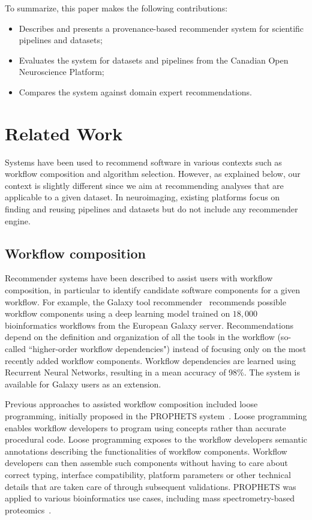 To summarize, this paper makes the following contributions:
\begin{itemize}
\item  Describes and presents a provenance-based recommender system for scientific
pipelines and datasets;
\item Evaluates the system for datasets and pipelines from the Canadian
Open Neuroscience Platform;
\item Compares the system against domain expert recommendations.
\end{itemize}

\section{Related Work}
    
Systems have been used to recommend software in various contexts such as workflow composition and algorithm selection. However, as explained below, our context is slightly different since we aim at recommending analyses that are applicable to a given dataset. In neuroimaging, existing platforms focus on finding and reusing pipelines and datasets but do not include any recommender engine.
    
\subsection{Workflow composition}

Recommender systems have been described to assist users with workflow composition, in particular to identify candidate software components for a given workflow. For example, the Galaxy tool recommender~\cite{kumar2021tool} recommends possible workflow components using a deep learning model trained on $18,000$ bioinformatics workflows from the European Galaxy server. Recommendations depend on the definition and organization of all the tools in the workflow (so-called ``higher-order workflow dependencies") instead of focusing only on the most recently added workflow components. Workflow dependencies are learned using Recurrent Neural Networks, resulting in a mean accuracy of 98\%. The system is available for Galaxy users as an extension. 

Previous approaches to assisted workflow composition included loose programming, initially proposed in the PROPHETS system~\cite{lamprecht2010synthesis,naujokat2012loose,lamprecht2013user}. Loose programming enables workflow developers to program using concepts rather than accurate procedural code. Loose programming exposes to the workflow developers semantic annotations describing the functionalities of workflow components. Workflow developers can then assemble such components without having to care about correct typing, interface compatibility, platform parameters or other technical details that are taken care of through subsequent validations. PROPHETS was applied to various bioinformatics use cases, including mass spectrometry-based proteomics~\cite{palmblad2019automated}.

